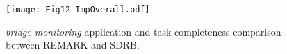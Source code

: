 \begin{figure}[t]
    \centering
    \texttt{[image: Fig12\_ImpOverall.pdf]}
    \caption{\emph{bridge-monitoring} application and task completeness comparison between REMARK and SDRB.}
    \label{fig:ImpOverall}
\end{figure}

\begin{comment}
%
\begin{figure}[t]
    \centering
    \texttt{[image: Fig12\_ImpRecover.pdf]}
    \caption{Performance comparison of REMARK and REMARK by executing \emph{bridge-monitoring} for $2$ minutes on NVnode.}
    \label{fig:ImpRecoverEvaluate}
\end{figure}

\begin{comment}
{To decouple the effect of outage rates, Fig.}~\ref{fig:ImpRecoverEvaluate}{ (a) shows an example of a typical recover procedure after one power failure, where REMARK reduces the recovery overhead by 61.8\%.}
 
\textbf{Re-initialization overhead} 
        Compared with the \emph{`init-all'} strategy in QuickRecall, REMARK reduces the re-initialization overhead from 55\% to 11\% with the \emph{`init-used'} strategy.

\textbf{B/R overhead} 
        B/R overhead represents the backup/restore overhead. Using hardware B/R functions, REMARK incurs negligible B/R time overhead.
     
\textbf{Rollback overhead} 
        The rollback overhead is a random scaled overhead which depends on the position where power failure disrupts the program. REMARK is able to complete more tasks with comparable rollback overheads of QuickRecall.


In conclusion, \emph{REMARK guarantees the reliability of I/O and peripheral operations, and the data transmission/collection completeness is improved by $9.3\times$/$2.7\times$  compared with the existing state-of-the-art software recovery strategies}.

%
\begin{figure}[t]
    \centering
    \texttt{[image: Fig13\_ImpOverheadDeadlock.pdf]}
    \caption{{Overhead and resilience analysis. (a) the overhead of wrapper code. (b) a micro case study of the worst case when the outage rate is too high. (c) a sweep analysis of recovery overhead with power failure rates.}}
    \label{fig:ImpOverheadDeadlock}
\end{figure}
\end{comment}